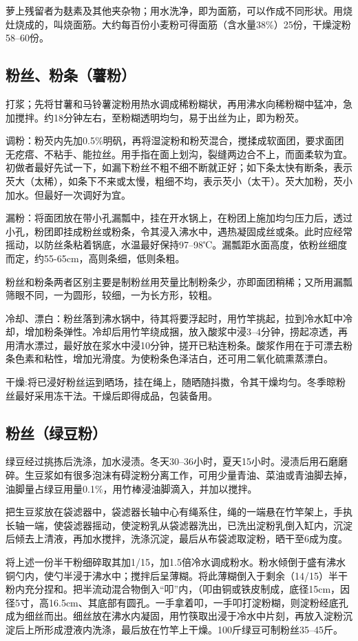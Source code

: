 \documentclass{ctexbook}
\begin{document}
萝上残留者为麸素及其他夹杂物；用水洗净，即为面筋，可以作成不同形状。用烧灶烧成的，叫烧面筋。大约每百份小麦粉可得面筋（含水量38\%）25份，干燥淀粉58--60份。
\subsection{粉丝、粉条（薯粉）}
打浆；先将甘薯和马铃薯淀粉用热水调成稀粉糊状，再用沸水向稀粉糊中猛冲，急加搅拌。约18分钟左右，至粉糊透明均匀，易于出丝为止，即为粉芡。

调粉：粉芡内先加0.5\%明矾，再将湿淀粉和粉芡混合，搅揉成软面团，要求面团无疙瘩、不粘手、能拉丝。用手指在面上划沟，裂缝两边合不上，而面柔软为宜。初做者最好先试一下，如漏下粉丝不粗不细不断就正好；如下条太快有断条，表示芡大（太稀），如条下不来或太慢，粗细不均，表示芡小（太干）。芡大加粉，芡小加水。但最好一次调好为宜。

漏粉：将面团放在带小孔漏瓢中，挂在开水锅上，在粉团上施加均匀压力后，透过小孔，粉团即挂成粉丝或粉条，令其浸入沸水中，遇热凝固成丝或条。此时应经常摇动，以防丝条粘着锅底，水温最好保持97--98℃。漏瓢距水面高度，依粉丝细度而定，约55-65cm，高则条细，低则条粗。

粉丝和粉条两者区别主要是制粉丝用芡量比制粉条少，亦即面团稍稀；又所用漏瓢筛眼不同，一为圆形，较细，一为长方形，较粗。

冷却、漂白：粉丝落到沸水锅中，待其将要浮起时，用竹竿挑起，拉到冷水缸中冷却，增加粉条弹性。冷却后用竹竿绕成捆，放入酸浆中浸3--4分钟，捞起凉透，再用清水漂过，最好放在浆水中浸10分钟，搓开已粘连粉条。酸浆作用在于可漂去粉条色素和粘性，增加光滑度。为使粉条色泽洁白，还可用二氧化硫熏蒸漂白。

干燥:将已浸好粉丝运到晒场，挂在绳上，随晒随抖擞，令其干燥均匀。冬季晾粉丝最好采用冻干法。干燥后即得成品，包装备用。
\subsection{粉丝（绿豆粉）}
绿豆经过挑拣后洗涤，加水浸渍。冬天30--36小时，夏天15小时。浸渍后用石磨磨碎。生豆浆如有很多泡沫有碍淀粉分离工作，可用少量青油、菜油或青油脚去掉，油脚量占绿豆用量0.1\%，用竹棒浸油脚滴入，并加以搅拌。

把生豆浆放在袋滤器中，袋滤器长轴中心有绳系住，绳的一端悬在竹竿架上，手执长轴一端，使袋滤器摇动，使淀粉乳从袋滤器洗出，已洗出淀粉乳倒入缸内，沉淀后倾去上清液，再加水搅拌，洗涤沉淀，最后从布袋滤取淀粉，晒干至6成为度。

将上述一份半干粉细碎取其加1/15，加1.5倍冷水调成粉水。粉水倾倒于盛有沸水铜勺内，使勺半浸于沸水中；搅拌后呈薄糊。将此薄糊倒入于剩余（14/15）半干粉内充分捏和。把半流动混合物倒入“叩”内，（叩由铜或铁皮制成，底径15cm，因径5寸，高16.5cm、其底部有圆孔。一手拿着叩，一手叩打淀粉糊，则淀粉经底孔成为细丝而出。细丝放在沸水内凝固，用竹筷取出浸于冷水中片刻，再放入淀粉沉淀后上所形成澄液内洗涤，最后放在竹竿上干燥。100斤绿豆可制粉丝35--45斤。
\end{document}
